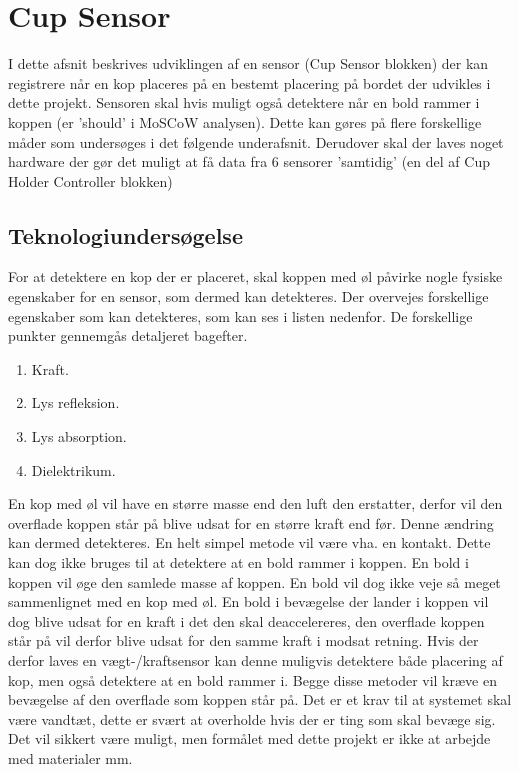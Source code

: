 \documentclass[HardwareDesign/HardwareDesign_main.tex]{subfiles}
\begin{document}
\section{Cup Sensor}
I dette afsnit beskrives udviklingen af en sensor (Cup Sensor blokken) der kan registrere når en kop placeres på en bestemt placering på bordet der udvikles i dette projekt. Sensoren skal hvis muligt også detektere når en bold rammer i koppen (er 
'should' i MoSCoW analysen). Dette kan gøres på flere forskellige måder som undersøges i det følgende underafsnit. Derudover skal der laves noget hardware der gør det muligt at få data fra 6 sensorer 'samtidig' (en del af Cup Holder Controller blokken)

\subsection{Teknologiundersøgelse}
For at detektere en kop der er placeret, skal koppen med øl påvirke nogle fysiske egenskaber for en sensor, som dermed kan detekteres. Der overvejes forskellige egenskaber som kan detekteres, som kan ses i listen nedenfor. De forskellige punkter gennemgås detaljeret bagefter.
\begin{enumerate}
    \item \label{itm:cupSensor_weight} Kraft.
    \item \label{itm:cupSensor_lightReflection} Lys refleksion. 
    \item \label{itm:cupSensor_lightAbsorbtion} Lys absorption.
    \item \label{itm:cupSensor_capacitive} Dielektrikum.
\end{enumerate}

En kop med øl vil have en større masse end den luft den erstatter, derfor vil den overflade koppen står på blive udsat for en større kraft end før. Denne ændring kan dermed detekteres. En helt simpel metode vil være vha. en kontakt. Dette kan dog ikke bruges til at detektere at en bold rammer i koppen. En bold i koppen vil øge den samlede masse af koppen. En bold vil dog ikke veje så meget sammenlignet med en kop med øl. En bold i bevægelse der lander i koppen vil dog blive udsat for en kraft i det den skal deaccelereres, den overflade koppen står på vil derfor blive udsat for den samme kraft i modsat retning. Hvis der derfor laves en vægt-/kraftsensor kan denne muligvis detektere både placering af kop, men også detektere at en bold rammer i. Begge disse metoder vil kræve en bevægelse af den overflade som koppen står på. Det er et krav til at systemet skal være vandtæt,  dette er svært at overholde hvis der er ting som skal bevæge sig. Det vil sikkert være muligt, men formålet med dette projekt er ikke at arbejde med materialer mm.
\end{document}
